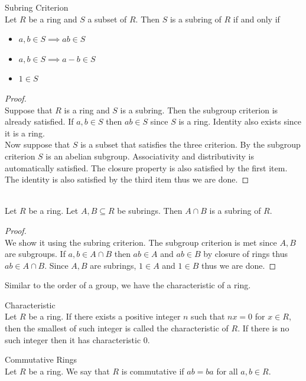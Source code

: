 \documentclass[a4paper]{article}
\begin{document}
\begin{prp}{Subring Criterion}{}\\
Let $R$ be a ring and $S$ a subset of $R$. Then $S$ is a subring of $R$ if and only if 
\begin{itemize}
\item $a,b\in S\implies ab\in S$
\item $a,b\in S\implies a-b\in S$
\item $1\in S$
\end{itemize}
\begin{proof}\\
Suppose that $R$ is a ring and $S$ is a subring. Then the subgroup criterion is already satisfied. If $a,b\in S$ then $ab\in S$ since $S$ is a ring. Identity also exists since it is a ring. \\
Now suppose that $S$ is a subset that satisfies the three criterion. By the subgroup criterion $S$ is an abelian subgroup. Associativity and distributivity is automatically satisfied. The closure property is also satisfied by the first item. The identity is also satisfied by the third item thus we are done. 
\end{proof}
\end{prp}

\begin{lmm}{}{}\\
Let $R$ be a ring. Let $A,B\subseteq R$ be subrings. Then $A\cap B$ is a subring of $R$. 
\begin{proof}\\
We show it using the subring criterion. The subgroup criterion is met since $A,B$ are subgroups. If $a,b\in A\cap B$ then $ab\in A$ and $ab\in B$ by closure of rings thus $ab\in A\cap B$. Since $A,B$ are subrings, $1\in A$ and $1\in B$ thus we are done. 
\end{proof}
\end{lmm}

Similar to the order of a group, we have the characteristic of a ring. 

\begin{defn}{Characteristic}{}\\
Let $R$ be a ring. If there exists a positive integer $n$ such that $nx=0$ for $x\in R$, then the smallest of such integer is called the characteristic of $R$. If there is no such integer then it has characteristic $0$. 
\end{defn}

\begin{defn}{Commutative Rings}{}\\
Let $R$ be a ring. We say that $R$ is commutative if $ab=ba$ for all $a,b\in R$. 
\end{defn}
\end{document}
